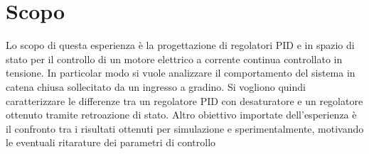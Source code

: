\section{Scopo}
\label{sec:Scopo}

	Lo scopo di questa esperienza è la progettazione di regolatori PID e in spazio di stato per il controllo di un motore elettrico a corrente continua controllato in tensione. In particolar modo si vuole analizzare il comportamento del sistema in catena chiusa sollecitato da un ingresso a gradino. Si vogliono quindi caratterizzare le differenze tra un regolatore PID con desaturatore e un regolatore ottenuto tramite retroazione di stato. Altro obiettivo importate dell'esperienza è il confronto tra i risultati ottenuti per simulazione e sperimentalmente, motivando le eventuali ritarature dei parametri di controllo